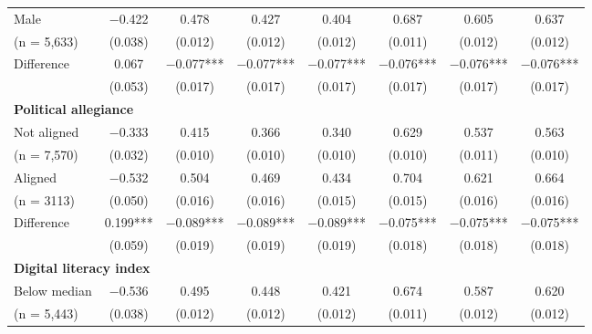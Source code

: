 \documentclass[letterpaper, 12pt, parskip=full,DIV=10]{scrartcl}
\begin{document}
\begin{table}[H]
{\begin{tabular}{lccccccc}
\hspace{1em} Male & \num{-0.422} & \num{0.478} & \num{0.427} & \num{0.404} & \num{0.687} & \num{0.605} & \num{0.637}\\
\hspace{1.5em}  (n = 5,633)  & (\num{0.038}) & (\num{0.012}) & (\num{0.012}) & (\num{0.012}) & (\num{0.011}) & (\num{0.012}) & (\num{0.012})\\
\cmidrule(lr){2-8}
\hspace{1em} Difference  & \num{0.067} & \num{-0.077}*** & \num{-0.077}*** & \num{-0.077}*** & \num{-0.076}*** & \num{-0.076}*** & \num{-0.076}***\\
 & (\num{0.053}) & (\num{0.017}) & (\num{0.017}) & (\num{0.017}) & (\num{0.017}) & (\num{0.017}) & (\num{0.017})\\
\multicolumn{4}{l}{\textbf{Political allegiance}} \rule{0pt}{1.2\normalbaselineskip}\\
\hspace{1em} Not aligned & \num{-0.333} & \num{0.415} & \num{0.366} & \num{0.340} & \num{0.629} & \num{0.537} & \num{0.563}\\
\hspace{1.5em} (n = 7,570)  & (\num{0.032}) & (\num{0.010}) & (\num{0.010}) & (\num{0.010}) & (\num{0.010}) & (\num{0.011}) & (\num{0.010})\\
\hspace{1em} Aligned & \num{-0.532} & \num{0.504} & \num{0.469} & \num{0.434} & \num{0.704} & \num{0.621} & \num{0.664}\\
\hspace{1.5em} (n = 3113) & (\num{0.050}) & (\num{0.016}) & (\num{0.016}) & (\num{0.015}) & (\num{0.015}) & (\num{0.016}) & (\num{0.016})\\
 \cmidrule(lr){2-8}
\hspace{1em} Difference & \num{0.199}*** & \num{-0.089}*** & \num{-0.089}*** & \num{-0.089}*** & \num{-0.075}*** & \num{-0.075}*** & \num{-0.075}***\\
 & (\num{0.059}) & (\num{0.019}) & (\num{0.019}) & (\num{0.019}) & (\num{0.018}) & (\num{0.018}) & (\num{0.018})\\
\multicolumn{4}{l}{\textbf{Digital literacy index }}  \rule{0pt}{1.2\normalbaselineskip}\\
\hspace{1em} Below median & \num{-0.536} & \num{0.495} & \num{0.448} & \num{0.421} & \num{0.674} & \num{0.587} & \num{0.620}\\
\hspace{1.5em}  (n = 5,443) & (\num{0.038}) & (\num{0.012}) & (\num{0.012}) & (\num{0.012}) & (\num{0.011}) & (\num{0.012}) & (\num{0.012})\\

\end{tabular}}
\end{table}
\end{document}
